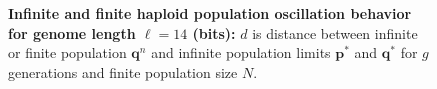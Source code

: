 \begin{figure}[H]
\begin{center}
{}\hspace{5pt}


\caption{\textbf{Infinite and finite haploid population oscillation behavior for genome length $\ell = 14$ (bits):} $d$ is
  distance between infinite or finite population ${\bm q}^n$ and infinite
  population limits ${{\bm p}^\ast}$ and ${{\bm q}^{\ast}}$ for $g$ generations and finite population size $N$.}
\label{oscillation_14h}
\end{center}
\end{figure}

